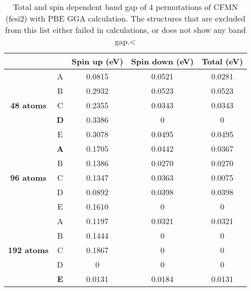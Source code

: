 \begin{table}[H]
\centering
\begin{tabular}{@{}ccccc@{}}
\toprule
                                                     &   & Spin up (eV) & Spin down (eV) & Total (eV) \\ \midrule
\multicolumn{1}{c|}{\multirow{5}{*}{\textbf{48 atoms}}}   
												  & A & 0.0815                & 0.0521                  & 0.0281              \\
\multicolumn{1}{c|}{}                                & B & 0.2932                & 0.0523                  & 0.0523              \\
\multicolumn{1}{c|}{}                                & C & 0.2355                & 0.0343                  & 0.0343              \\
\multicolumn{1}{c|}{}                                & \textbf{D} & 0.3386                & 0                       & 0                   \\
\multicolumn{1}{c|}{}                                & E & 0.3078                & 0.0495                  & 0.0495              \\ \midrule
\multicolumn{1}{c|}{\multirow{5}{*}{\textbf{96 atoms}}}   
                                                     & \textbf{A} & 0.1705                & 0.0442                  & 0.0367              \\ 
\multicolumn{1}{c|}{}                                & B & 0.1386                & 0.0270                  & 0.0270                   \\
\multicolumn{1}{c|}{}                                & C & 0.1347                & 0.0363                  & 0.0075                   \\
\multicolumn{1}{c|}{}                                & D & 0.0892                & 0.0398                  & 0.0398                   \\
\multicolumn{1}{c|}{}                                & E & 0.1610                & 0                       & 0                        \\ \midrule
\multicolumn{1}{c|}{\multirow{5}{*}{\textbf{192 atoms}}}
	 									           & A & 0.1197                & 0.0321                  & 0.0321                   \\
\multicolumn{1}{c|}{}                                & B & 0.1444                & 0                       & 0                        \\
\multicolumn{1}{c|}{}                                & C & 0.1867                & 0                       & 0                   \\
\multicolumn{1}{c|}{}                                & D & 0                     & 0                       & 0          \\
\multicolumn{1}{c|}{}                                & \textbf{E} & 0.0131                & 0.0184                       & 0.0131                   \\ \bottomrule
\end{tabular}
\caption{Total and spin dependent band gap of 4 permutations of CFMN (fesi2) with PBE GGA calculation. The structures that are excluded from this list either failed in calculations, or does not show any band gap.<}
\end{table}
